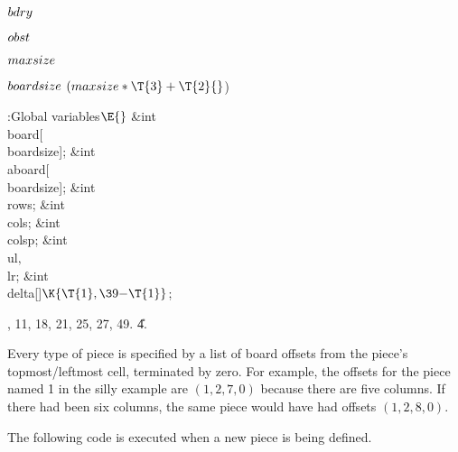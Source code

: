 \Y\B\4\D$\\{bdry}$ \5
\par
\B\4\D$\\{obst}$ \5
\par
\B\4\D$\\{maxsize}$ \5
\par
\B\4\D$\\{boardsize}$ \5
$(\\{maxsize}*\T{3}+\T{2}{}$)\par
\Y\B\4:Global variables\X${}\E{}$\6
\&{int} \\{board}[\\{boardsize}];\6
\&{int} \\{aboard}[\\{boardsize}];\6
\&{int} \\{rows};\6
\&{int} \\{cols};\6
\&{int} \\{colsp};\6
\&{int} \\{ul}${},{}$ \\{lr};\6
\&{int} \\{delta}[]${}\K\{\T{1},\39{-}\T{1}\}{}$;\par
{}, 11, 18, 21, 25, 27, 49.
\U4.\fi

Every type of piece is specified by a list of board offsets from the
piece's topmost/leftmost cell, terminated by zero. For example, the
offsets for the piece named \.1 in the silly example are
$(1, 2, 7, 0)$ because there are five columns.
If there had been six columns, the same piece would have had
offsets $(1,2,8,0)$.

The following code is executed when a new piece is being defined.

